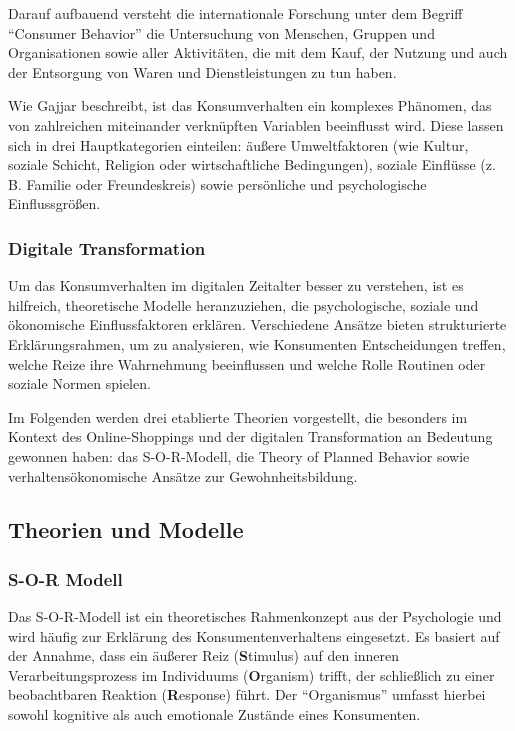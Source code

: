 Darauf aufbauend versteht die internationale Forschung unter dem Begriff \enquote{Consumer Behavior} die Untersuchung von Menschen, Gruppen und Organisationen sowie aller Aktivitäten, die mit dem Kauf, der Nutzung und auch der Entsorgung von Waren und Dienstleistungen zu tun haben.

Wie Gajjar beschreibt, ist das Konsumverhalten ein komplexes Phänomen, das von zahlreichen miteinander verknüpften Variablen beeinflusst wird. Diese lassen sich in drei Hauptkategorien einteilen: äußere Umweltfaktoren (wie Kultur, soziale Schicht, Religion oder wirtschaftliche Bedingungen), soziale Einflüsse (z. B. Familie oder Freundeskreis) sowie persönliche und psychologische Einflussgrößen. 

\subsubsection{Digitale Transformation}
Um das Konsumverhalten im digitalen Zeitalter besser zu verstehen, ist es hilfreich, theoretische Modelle heranzuziehen, die psychologische, soziale und ökonomische Einflussfaktoren erklären. Verschiedene Ansätze bieten strukturierte Erklärungsrahmen, um zu analysieren, wie Konsumenten Entscheidungen treffen, welche Reize ihre Wahrnehmung beeinflussen und welche Rolle Routinen oder soziale Normen spielen. 

Im Folgenden werden drei etablierte Theorien vorgestellt, die besonders im Kontext des Online-Shoppings und der digitalen Transformation an Bedeutung gewonnen haben: 
das S-O-R-Modell, die Theory of Planned Behavior sowie verhaltensökonomische Ansätze zur Gewohnheitsbildung. 

\subsection{Theorien und Modelle}
\subsubsection{S-O-R Modell}
Das S-O-R-Modell ist ein theoretisches Rahmenkonzept aus der Psychologie und wird häufig zur Erklärung des Konsumentenverhaltens eingesetzt. Es basiert auf der Annahme, dass ein äußerer Reiz (\textbf{S}timulus) auf den inneren Verarbeitungsprozess im Individuums (\textbf{O}rganism) trifft, der schließlich zu einer beobachtbaren Reaktion (\textbf{R}esponse) führt. Der \enquote{Organismus} umfasst hierbei sowohl kognitive als auch emotionale Zustände eines Konsumenten.

